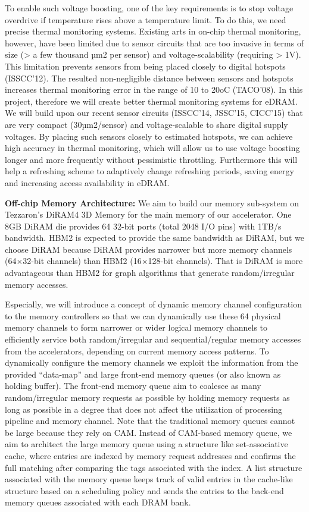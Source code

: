 To enable such voltage boosting, one of the key requirements is to stop voltage overdrive if temperature rises above a temperature limit. 
To do this, we need precise thermal monitoring systems. 
Existing arts in on-chip thermal monitoring, however, have been limited due to sensor circuits that are too invasive in terms of size (> a few thousand µm2 per sensor) and voltage-scalability (requiring > 1V). 
This limitation prevents sensors from being placed closely to digital hotspots (ISSCC’12). 
The resulted non-negligible distance between sensors and hotspots increases thermal monitoring error in the range of 10 to 20oC (TACO’08). 
In this project, therefore we will create better thermal monitoring systems for eDRAM. 
We will build upon our recent sensor circuits (ISSCC’14, JSSC’15, CICC’15) that are very compact (30µm2/sensor) and voltage-scalable to share digital supply voltages. 
By placing such sensors closely to estimated hotspots, we can achieve high accuracy in thermal monitoring, which will allow us to use voltage boosting longer and more frequently without pessimistic throttling. 
Furthermore this will help a refreshing scheme to adaptively change refreshing periods, saving energy and increasing access availability in eDRAM. 

\noindent
\textbf{Off-chip Memory Architecture:} 
We aim to build our memory sub-system on Tezzaron’s DiRAM4 3D Memory for the main memory of our accelerator. 
One 8GB DiRAM die provides 64 32-bit ports (total 2048 I/O pins) with 1TB/s bandwidth. 
HBM2 is expected to provide the same bandwidth as DiRAM, but we choose DiRAM because DiRAM provides narrower but more memory channels (64×32-bit channels) than HBM2 (16×128-bit channels). 
That is DiRAM is more advantageous than HBM2 for graph algorithms that generate random/irregular memory accesses. 

Especially, we will introduce a concept of dynamic memory channel configuration to the memory controllers so that we can dynamically use these 64 physical memory channels to form narrower or wider logical memory channels to efficiently service both random/irregular and sequential/regular memory accesses from the accelerators, depending on current memory access patterns. 
To dynamically configure the memory channels we exploit the information from the provided ``data-map'' and large front-end memory queues (or also known as holding buffer).
The front-end memory queue aim to coalesce as many random/irregular memory requests as possible by holding memory requests as long as possible in a degree that does not affect the utilization of processing pipeline and memory channel.
Note that the traditional memory queues cannot be large because they rely on CAM.
Instead of CAM-based memory queue, we aim to architect the large memory queue using a structure like set-associative cache, where entries are indexed by memory request addresses and confirms the full matching after comparing the tags associated with the index.
A list structure associated with the memory queue keeps track of valid entries in the cache-like structure based on a scheduling policy and sends the entries to the back-end memory queues associated with each DRAM bank.
